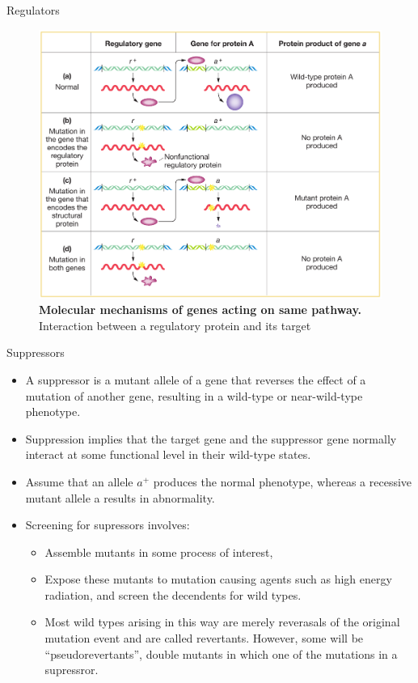 \documentclass[11pt,dvipsnames,ignorenonframetext,aspectratio=169]{beamer}
\providecommand{\tightlist}{%
  \setlength{\itemsep}{0pt}\setlength{\parskip}{0pt}}
\begin{document}
\begin{frame}{Regulators}
\protect\hypertarget{regulators}{}
\begin{figure}

{\centering \includegraphics[width=0.48\linewidth]{./../images/genes_in_same_pathway_biochemical} 

}

\caption{\textbf{Molecular mechanisms of genes acting on same pathway.} Interaction between a regulatory protein and its target}\label{fig:functional-regulatory-gene}
\end{figure}
\end{frame}

\begin{frame}{Suppressors}
\protect\hypertarget{suppressors}{}
\begin{itemize}
\tightlist
\item
  A suppressor is a mutant allele of a gene that reverses the effect of
  a mutation of another gene, resulting in a wild-type or near-wild-type
  phenotype.
\item
  Suppression implies that the target gene and the suppressor gene
  normally interact at some functional level in their wild-type states.
\item
  Assume that an allele \(a^+\) produces the normal phenotype, whereas a
  recessive mutant allele a results in abnormality.
\item
  Screening for supressors involves:

  \begin{itemize}
  \tightlist
  \item
    Assemble mutants in some process of interest,
  \item
    Expose these mutants to mutation causing agents such as high energy
    radiation, and screen the decendents for wild types.
  \item
    Most wild types arising in this way are merely reverasals of the
    original mutation event and are called revertants. However, some
    will be ``pseudorevertants'', double mutants in which one of the
    mutations in a supressror.
  \end{itemize}
\end{itemize}
\end{frame}
\end{document}
